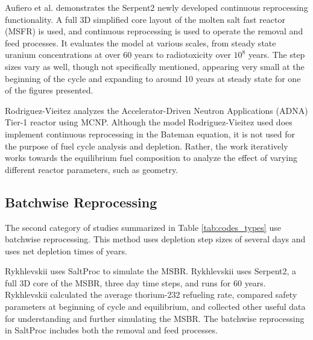 Aufiero et al. \cite{aufiero_extended_2013} demonstrates the Serpent2 newly developed continuous reprocessing functionality. A full 3D simplified core layout of the molten salt fast reactor (MSFR) is used, and continuous reprocessing is used to operate the removal and feed processes. It evaluates the model at various scales, from steady state uranium concentrations at over 60 years to radiotoxicity over $10^8$ years. The step sizes vary as well, though not specifically mentioned, appearing very small at the beginning of the cycle and expanding to around 10 years at steady state for one of the figures presented.

Rodriguez-Vieitez \cite{rodriguez-vieitez_transmutation_2002} analyzes the Accelerator-Driven Neutron Applications (ADNA) Tier-1 reactor using MCNP. Although the model Rodriguez-Vieitez used does implement continuous reprocessing in the Bateman equation, it is not used for the purpose of fuel cycle analysis and depletion. Rather, the work iteratively works towards the equilibrium fuel composition to analyze the effect of varying different reactor parameters, such as geometry.


\subsection{Batchwise Reprocessing}
\label{litrev-msr-batchwise}

The second category of studies summarized in Table \ref{tab:codes_types} use batchwise reprocessing. This method uses depletion step sizes of several days and uses net depletion times of years.

Rykhlevskii \cite{rykhlevskii_modeling_2019} uses SaltProc to simulate the MSBR. Rykhlevskii uses Serpent2, a full 3D core of the MSBR, three day time steps, and runs for 60 years.
Rykhlevskii calculated the average thorium-232 refueling rate, compared safety parameters at beginning of cycle and equilibrium, and collected other useful data for understanding and further simulating the MSBR.
The batchwise reprocessing in SaltProc includes both the removal and feed processes.

